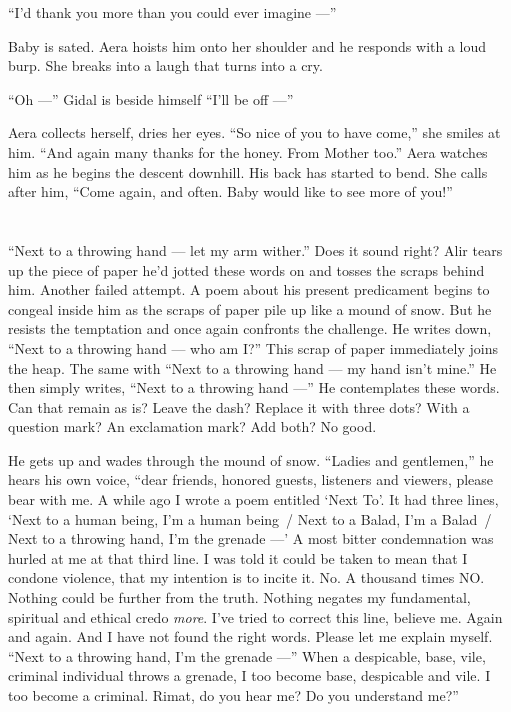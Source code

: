\documentclass[twoside,11pt,openany]{book}
\begin{document}
``I'd thank you more than you could ever imagine ---''

Baby is sated. Aera hoists him onto her shoulder and he responds with a loud burp. She breaks into a laugh that turns
into a cry.

``Oh ---'' Gidal is beside himself ``I'll be off ---''

Aera collects herself, dries her eyes. ``So nice of you to have come,'' she smiles at him.
``And again many thanks for the honey. From Mother too.'' Aera watches him as he begins the
descent downhill.  His back has started to bend. She calls after him, ``Come again, and often. Baby would
like to see more of you!''


\chapter{}

``Next to a throwing hand --- let my arm wither.'' Does it sound right? Alir tears up the piece of paper he'd
jotted these words on{ }and tosses the scraps behind him. Another failed
attempt.  A poem about his present predicament begins to congeal inside him as the scraps of paper pile up like a mound
of snow. But he resists the temptation and once again confronts the challenge. He writes down, ``Next to a
throwing hand --- who am I?'' This scrap of paper immediately joins the heap. The same with
``Next to a throwing hand --- my hand isn't mine.'' He then
simply{ }writes, ``Next to a throwing hand ---'' He
contemplates these words. Can that remain as is? Leave the dash?  Replace it with three dots? With a question mark?
An exclamation mark? Add both? No good.

He gets up and wades through the mound of snow. ``Ladies and gentlemen,'' he hears his own
voice, ``dear friends, honored guests, listeners and viewers, please bear with me. A while ago I wrote a
poem entitled `Next To'. It had three lines, `Next to a human being, I'm a
human being~/ Next to a Balad, I'm a Balad~/ Next to a throwing hand, I'm the grenade ---' A most bitter
condemnation was hurled at me at that  third line. I was told it could be taken to mean that I condone violence, that
my intention is to incite it. No. A thousand times NO.  Nothing could be further from the truth. Nothing negates my
fundamental, spiritual and ethical credo \textit{more}. I've tried to correct this line, believe me. Again and again.
And I have not found the right words. Please let me explain myself. ``Next to a throwing hand, I'm the
grenade ---'' When a despicable, base, vile, criminal individual throws a grenade, I too become base,
despicable{ }and vile. I too become a criminal. Rimat, do you hear me? Do you
understand me?''
\end{document}
